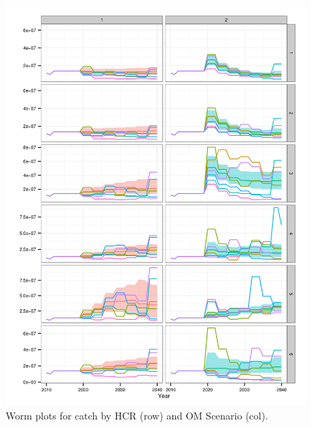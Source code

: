 \documentclass[a4paper, 10pt]{article}
\begin{document}
\begin{figure}[htbp]
\centering
\includegraphics[width=6in]{iY.png}
\caption{Worm plots for catch by HCR (row) and OM Scenario (col).}
\label{fig:5}
\end{figure}
\end{document}
